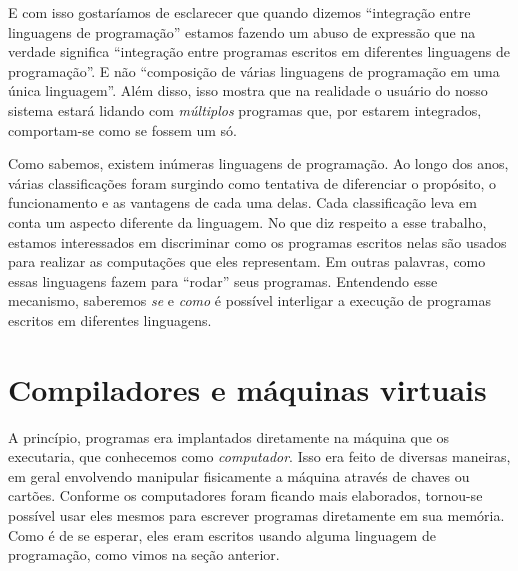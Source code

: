 
  E com isso gostaríamos de esclarecer que quando dizemos ``integração entre
  linguagens de programação'' estamos fazendo um abuso de expressão que na
  verdade significa ``integração entre programas escritos em diferentes
  linguagens de programação''. E não ``composição de várias linguagens de
  programação em uma única linguagem''. Além disso, isso mostra que na realidade
  o usuário do nosso sistema estará lidando com \emph{múltiplos} programas que,
  por estarem integrados, comportam-se como se fossem um só.

  Como sabemos, existem inúmeras linguagens de programação. Ao longo dos anos,
  várias classificações foram surgindo como tentativa de diferenciar o
  propósito, o funcionamento e as vantagens de cada uma delas. Cada
  classificação leva em conta um aspecto diferente da linguagem. No que diz
  respeito a esse trabalho, estamos interessados em discriminar como os
  programas escritos nelas são usados para realizar as computações que eles
  representam. Em outras palavras, como essas linguagens fazem para ``rodar''
  seus programas. Entendendo esse mecanismo, saberemos \emph{se} e \emph{como} é
  possível interligar a execução de programas escritos em diferentes linguagens.

  \section{Compiladores e máquinas virtuais}
  \label{cap:conceitos:compiladores}

  A princípio, programas era implantados diretamente na máquina que os
  executaria, que conhecemos como \emph{computador}. Isso era feito de diversas
  maneiras, em geral envolvendo manipular fisicamente a máquina através de
  chaves ou cartões. Conforme os computadores foram ficando mais elaborados,
  tornou-se possível usar eles mesmos para escrever programas diretamente em
  sua memória. Como é de se esperar, eles eram escritos usando alguma linguagem
  de programação, como vimos na seção anterior.

